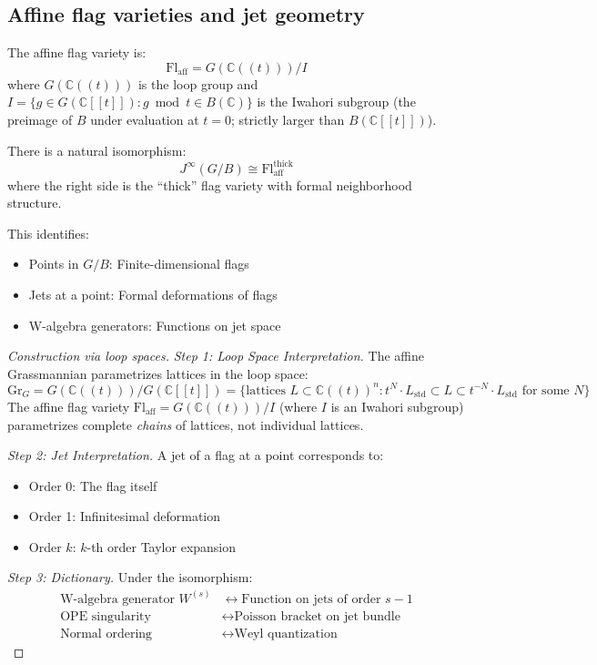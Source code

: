 
\subsection{Affine flag varieties and jet geometry}

\begin{definition}\label{def:aff-flag}
The affine flag variety is:
\[
\mathrm{Fl}_{\mathrm{aff}} = G(\mathbb{C}((t)))/I
\]
where $G(\mathbb{C}((t)))$ is the loop group and
$I = \{g \in G(\mathbb{C}[[t]]) : g \bmod t \in B(\mathbb{C})\}$ is the Iwahori subgroup
(the preimage of $B$ under evaluation at $t = 0$; strictly larger than $B(\mathbb{C}[[t]])$).
\end{definition}

\begin{theorem}\label{thm:jet-flag}
There is a natural isomorphism:
\[
J^{\infty}(G/B) \cong \mathrm{Fl}_{\mathrm{aff}}^{\mathrm{thick}}
\]
where the right side is the ``thick'' flag variety with formal neighborhood structure.

This identifies:
\begin{itemize}
\item Points in $G/B$: Finite-dimensional flags
\item Jets at a point: Formal deformations of flags
\item W-algebra generators: Functions on jet space
\end{itemize}
\end{theorem}

\begin{proof}[Construction via loop spaces]
\emph{Step 1: Loop Space Interpretation.} The affine Grassmannian parametrizes lattices in the loop space:
\[
\mathrm{Gr}_G = G(\mathbb{C}((t)))/G(\mathbb{C}[[t]]) = \{\text{lattices } L \subset \mathbb{C}((t))^n : t^N \cdot L_{\mathrm{std}} \subset L \subset t^{-N} \cdot L_{\mathrm{std}} \text{ for some } N\}
\]
The affine flag variety $\mathrm{Fl}_{\mathrm{aff}} = G(\mathbb{C}((t)))/I$ (where $I$ is an Iwahori subgroup) parametrizes complete \emph{chains} of lattices, not individual lattices.

\emph{Step 2: Jet Interpretation.} A jet of a flag at a point corresponds to:
\begin{itemize}
\item Order 0: The flag itself
\item Order 1: Infinitesimal deformation
\item Order $k$: $k$-th order Taylor expansion
\end{itemize}

\emph{Step 3: Dictionary.} Under the isomorphism:
\begin{align}
\text{W-algebra generator } W^{(s)} &\leftrightarrow \text{Function on jets of order } s-1 \\
\text{OPE singularity} &\leftrightarrow \text{Poisson bracket on jet bundle} \\
\text{Normal ordering} &\leftrightarrow \text{Weyl quantization}
\end{align}
\end{proof}

